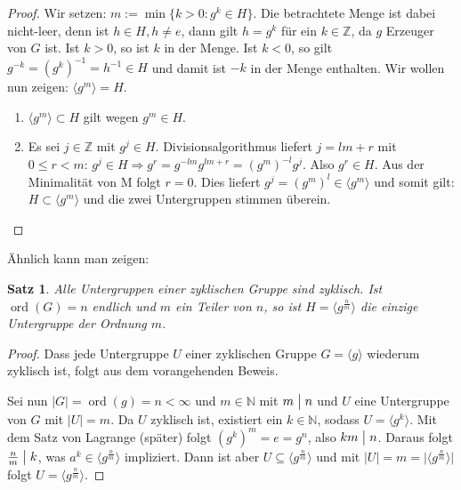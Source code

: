 \documentclass[12pt]{scrartcl} %
\DeclareMathOperator{\ord}{ord}
\newcommand{\inv}[1]{\left(#1\right)^{-1}}
\newcommand{\Inv}[1]{#1^{-1}}
\newcommand{\divides}{\mathrel{\bigm|}}
\newtheorem{thm}{Satz}
\theoremstyle{definition}
\theoremstyle{remark}
\begin{document}
\begin{proof}
	Wir setzen: $m := \min\lbrace k>0 : g^{k} \in H \rbrace$.
	Die betrachtete Menge ist dabei nicht-leer, denn ist $h \in H, h \neq e$, dann gilt $h = g^{k}$ für ein $k\in\mathbb{Z}$, da $g$ Erzeuger von $G$ ist.
	Ist $k>0$, so ist $k$ in der Menge.
	Ist $k<0$, so gilt $g^{-k}=\inv{{g^k}}=\Inv{h}\in H$ und damit ist $-k$ in der Menge enthalten.
	Wir wollen nun zeigen: $\langle g^{m} \rangle = H$.
	\begin{enumerate}
	\item $\langle g^{m} \rangle \subset H$ gilt wegen $g^{m} \in H$.
	\item Es sei $j \in \mathbb{Z}$ mit $g^{j} \in H$. Divisionsalgorithmus liefert $j=lm+r$ mit $0 \leq r < m$: $g^{j} \in H \Rightarrow g^{r}=g^{-lm}g^{lm+r}=(g^{m})^{-l}g^{j}$. Also $g^{r} \in H$. Aus der Minimalität von M folgt $r=0$. Dies liefert $g^{j}=(g^{m})^{l} \in \langle g^{m} \rangle$ und somit gilt: $H \subset \langle g^{m} \rangle$ und die zwei Untergruppen stimmen überein. \qedhere
	\end{enumerate}
\end{proof}

Ähnlich kann man zeigen:

\begin{thm} %
	Alle Untergruppen einer zyklischen Gruppe sind zyklisch.
	Ist $\ord(G)=n$ endlich und $m$ ein Teiler von $n$, so ist $H = \langle g^{\frac{n}{m}}\rangle$ die einzige Untergruppe der Ordnung $m$.
\end{thm}

\begin{proof}
  Dass jede Untergruppe $U$ einer zyklischen Gruppe $G = \langle g \rangle$ wiederum zyklisch ist, folgt aus dem vorangehenden Beweis. 
  
  Sei nun $\lvert G \rvert = \ord(g) = n < \infty$ und $m \in \mathbb{N}$ mit $m \divides n$ und $U$ eine Untergruppe von $G$ mit $\lvert U \rvert = m$. Da $U$ zyklisch ist, existiert ein $k \in \mathbb{N}$, sodass $U = \langle g^k \rangle$. Mit dem Satz von Lagrange (später) folgt $(g^k)^m = e = g^n$, also $km \divides n$. Daraus folgt $\frac{n}{m} \divides k$, was $a^k \in \langle g^\frac{n}{m} \rangle$ impliziert. Dann ist aber $U \subseteq \langle{g^\frac{n}{m}} \rangle$ und mit $\lvert U \rvert = m = \lvert \langle g^\frac{n}{m} \rangle \rvert$ folgt $U = \langle{g^\frac{n}{m}} \rangle$.
\end{proof}
\end{document}
